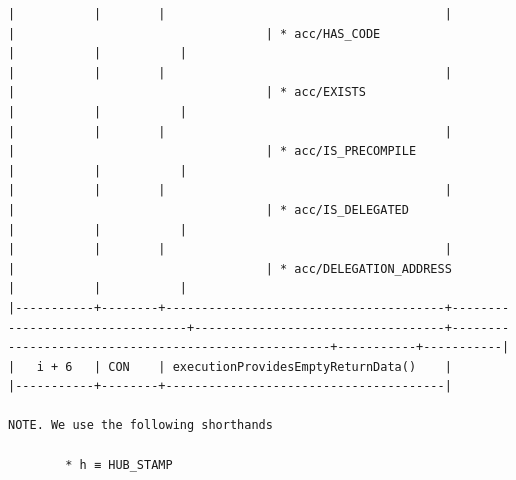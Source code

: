 \documentclass[varwidth=\maxdimen,margin=0.5cm,multi={verbatim}]{standalone}
\begin{document}
\begin{verbatim}
|           |        |                                       |                                 |                                   | * acc/HAS_CODE                                      |           |           |
|           |        |                                       |                                 |                                   | * acc/EXISTS                                        |           |           |
|           |        |                                       |                                 |                                   | * acc/IS_PRECOMPILE                                 |           |           |
|           |        |                                       |                                 |                                   | * acc/IS_DELEGATED                                  |           |           |
|           |        |                                       |                                 |                                   | * acc/DELEGATION_ADDRESS                            |           |           |
|-----------+--------+---------------------------------------+---------------------------------+-----------------------------------+-----------------------------------------------------+-----------+-----------|
|   i + 6   | CON    | executionProvidesEmptyReturnData()    |
|-----------+--------+---------------------------------------|

NOTE. We use the following shorthands

        * h ≡ HUB_STAMP

\end{verbatim}
\end{document}
